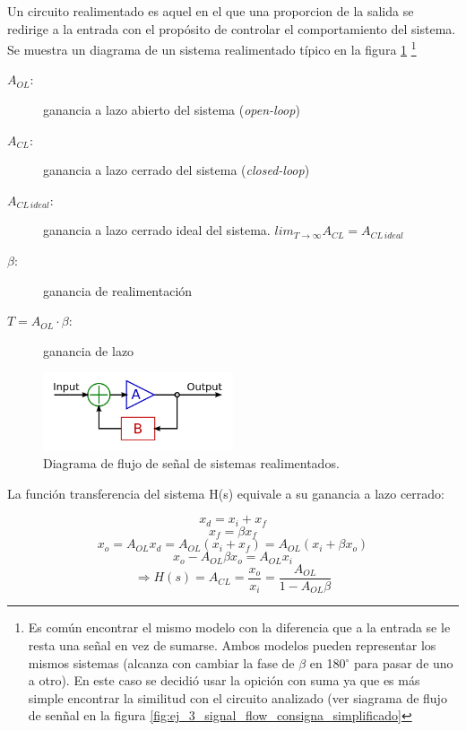 \documentclass[../../main.tex]{subfiles}
\begin{document}
Un circuito realimentado es aquel en el que una proporcion de la salida se redirige a la entrada con el prop\'osito de controlar el comportamiento del sistema. Se  muestra un diagrama de un sistema realimentado t\'ipico en la figura \ref{fig:ej_3_realimentacion}
\footnote{Es com\'un encontrar el mismo modelo con la diferencia que a la entrada se le resta una se\~nal en vez de sumarse. Ambos modelos pueden representar los mismos sistemas (alcanza con cambiar la fase de $\beta$ en 180$^\circ$ para pasar de uno a otro). En este caso se decidi\'o usar la opici\'on con suma ya que es m\'as simple encontrar la similitud con el circuito analizado (ver siagrama de flujo de sen\~nal en la figura \ref{fig:ej_3_signal_flow_consigna_simplificado}}

\begin{description}
	\item[$A_{OL}$:] ganancia a lazo abierto del sistema (\textit{open-loop})
	\item[$A_{CL}$:] ganancia a lazo cerrado del sistema (\textit{closed-loop})
	\item[$A_{CL\,ideal}$:] ganancia a lazo cerrado ideal del sistema. $lim_{T\rightarrow \infty}A_{CL} = A_{CL\,ideal}$
	\item[$\beta$:] ganancia de realimentaci\'on
	\item[$T=A_{OL}\cdot\beta$:] ganancia de lazo
\end{description}

\begin{figure}[htbp] %
	\centering
	\includegraphics[width=0.5\textwidth]{imagenes/Ideal_feedback_model.png}
	\caption{Diagrama de flujo de se\~nal de sistemas realimentados.}
	\label{fig:ej_3_realimentacion}
\end{figure}


La funci\'on transferencia del sistema H(s) equivale a su ganancia a lazo cerrado:

\[x_d = x_i+x_f\]
\[x_f = \beta x_f\]
\[x_o = A_{OL}x_d = A_{OL}\left( x_i+x_f \right) =  A_{OL}\left( x_i+\beta x_o \right)\]
\[x_o - A_{OL} \beta x_o = A_{OL} x_i\]
\begin{equation}
	\Rightarrow H(s) = A_{CL} = \frac{x_o}{x_i} = \frac{A_{OL}}{1-A_{OL}\beta}
	\label{eq:ej_3_ACL}
\end{equation}
\end{document}

